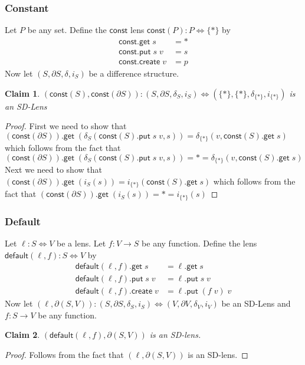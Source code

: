 \documentclass[acmsmall,review,anonymous]{acmart}\settopmatter{printfolios=true,printccs=false,printacmref=false}
\newtheorem{claim}{Claim}
\newcommand{\kw}[1]{\ensuremath{\mathsf{#1}}\xspace}
\newcommand{\get}{\ensuremath{\kw{get}}\xspace}
\newcommand{\pput}{\ensuremath{\kw{put}}\xspace}
\newcommand{\create}{\ensuremath{\kw{create}}\xspace}
\newcommand{\const}{\ensuremath{\kw{const}}\xspace}
\newcommand{\default}{\ensuremath{\kw{default}}\xspace}
\begin{document}
\subsubsection{Constant}
Let $P$ be any set. Define the \const lens $\const(P) : P \Leftrightarrow \{*\}$
by
\begin{align*}
\const.\get \; s &= *\\
\const.\pput \; s \; v &= s\\
\const.\create \; v &= p
\end{align*}
Now let $(S, \partial S, \delta, i_S)$ be a difference structure.
\begin{claim}
$(\const(S),  \const(\partial S)) : (S, \partial S, \delta_S, i_S)
\Leftrightarrow (\{*\}, \{*\}, \delta_{\{*\}}, i_{\{*\}})$ is an SD-Lens
\end{claim}
\begin{proof}
First we need to show that $(\const(\partial S)).\get \;
(\delta_S(\const(S).\pput \; s \; v, s)) = \delta_{\{*\}}(v, \const(S).\get \;
s)$ which follows from the fact that $ (\const(\partial S)).\get \;
(\delta_S(\const(S).\pput \; s \; v, s)) = * = \delta_{\{*\}}(v, \const(S).\get
\; s) $
Next we need to show that $(\const(\partial S)).\get \; (i_{S}(s)) =
i_{\{*\}}(\const(S).\get \; s)$ which follows from the fact that
$(\const(\partial S)).\get \; (i_{S}(s)) = * = i_{\{*\}}(s)$
\end{proof}

\subsubsection{Default}
Let $\ell : S \Leftrightarrow V$ be a lens. Let $f :
V \longrightarrow S$ be any function. Define the lens $\default(\ell, f) :
S \Leftrightarrow V$ by
\begin{align*}
\default(\ell, f).\get \; s &= \ell.\get \; s\\
\default(\ell, f).\pput \; s \; v &= \ell.\pput \; s \; v\\
\default(\ell, f).\create \; v &= \ell.\pput \; (f \; v) \; v
\end{align*}
Now let $(\ell, \partial (S, V)) : (S, \partial S, \delta_S, i_S) \Leftrightarrow
(V, \partial V, \delta_V, i_V)$ be an SD-Lens and $f: S \longrightarrow V$ be
any function.
\begin{claim}
$(\default(\ell, f), \partial (S, V))$ is an SD-lens.
\end{claim}
\begin{proof}
Follows from the fact that $(\ell, \partial (S, V))$ is an SD-lens.
\end{proof}
\end{document}
